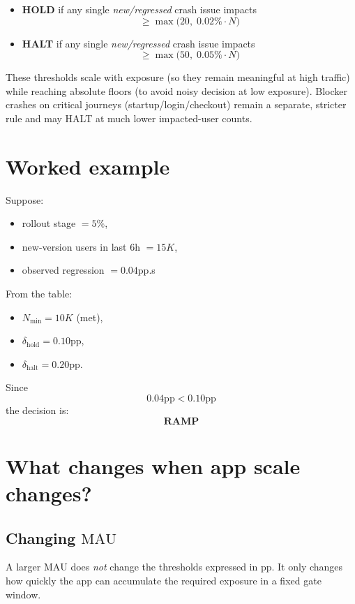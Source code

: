 \documentclass{article}
\newcommand{\MAU}{\mathrm{MAU}}
\newcommand{\pp}{\text{pp}}
\newcommand{\dhalt}{\delta_{\text{halt}}}
\newcommand{\dhold}{\delta_{\text{hold}}}
\begin{document}
\begin{itemize}
    \item \textbf{HOLD} if any single \emph{new/regressed} crash issue impacts
    \[
    \ge \max\bigl(20,\;0.02\% \cdot N\bigr)
    \]
    \item \textbf{HALT} if any single \emph{new/regressed} crash issue impacts
    \[
    \ge \max\bigl(50,\;0.05\% \cdot N\bigr)
    \]
\end{itemize}

These thresholds scale with exposure (so they remain meaningful at high traffic)
while reaching absolute floors (to avoid noisy decision at low exposure). Blocker crashes on critical journeys (startup/login/checkout) remain a separate, stricter rule and may HALT at much lower impacted-user counts.

\section{Worked example}

Suppose:
\begin{itemize}[leftmargin=1.4em]
    \item rollout stage $= 5\%$,
    \item new-version users in last 6h $= 15K$,
    \item observed regression $= 0.04\pp$.s
\end{itemize}

From the table:

\begin{itemize}[leftmargin=1.4em]
    \item $N_{\min} = 10K$ \quad (met),
    \item $\dhold = 0.10\pp$,
    \item $\dhalt = 0.20\pp$.
\end{itemize}

Since
\[
0.04\pp < 0.10\pp
\]
the decision is:
\[
\textbf{RAMP}
\]

\section{What changes when app scale changes?}

\subsection{Changing $\MAU$}

A larger $\MAU$ does \emph{not} change the thresholds expressed in $\pp$.
It only changes how quickly the app can accumulate the required exposure in a fixed gate
window.
\end{document}
